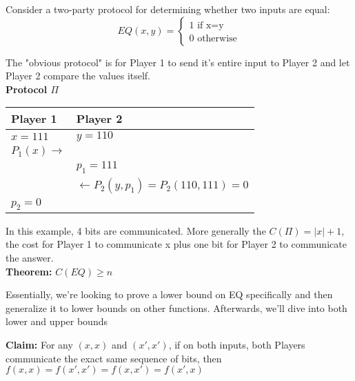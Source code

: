 \documentclass[12pt]{article}
\begin{document}
\maketitle

Consider a two-party protocol for determining whether two inputs are equal:
\begin{equation}
  EQ(x, y) =
  \begin{cases}
    1 \text{ if x=y} \\
    0 \text{ otherwise}
  \end{cases}
\end{equation}


The "obvious protocol" is for Player 1 to send it's entire input to Player 2 and let Player 2 compare the values itself.
\\

\textbf{Protocol $\Pi$}
\begin{center}
  \begin{tabular}{ |m{15em}|m{15em}| } 
    \hline
    Player 1                   & Player 2 \\ [0.5ex] 
    \hline
    $x=111$                    & $y=110$ \\
    $P_{1}(x) \longrightarrow$ &  \\
                               & $p_{1} = 111$ \\
                               & $\longleftarrow P_{2}(y, p_{1}) = P_{2}(110, 111) = 0$ \\
    $p_{2} = 0$                & \\
    \hline
  \end{tabular}
\end{center}

In this example, 4 bits are communicated. More generally the $C(\Pi) = |x| + 1$, the cost for Player 1 to communicate x
plus one bit for Player 2 to communicate the answer.
\\

\textbf{Theorem:} $C(EQ) \geq n$
\\

\par{Essentially, we're looking to prove a lower bound on EQ specifically and then generalize it to lower bounds on
other functions. Afterwards, we'll dive into both lower and upper bounds}

\textbf{Claim:} For any $(x, x)$ and $(x', x')$, if on both inputs, both Players communicate the exact same sequence of
bits, then $f(x, x) = f(x', x') = f(x, x') = f(x', x)$
\end{document}
